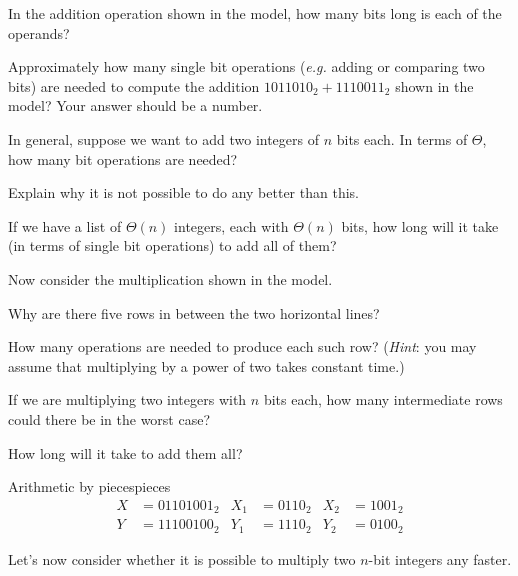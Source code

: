 \documentclass{tufte-handout}
\begin{document}
\begin{questions}
\item In the addition operation shown in the model, how many bits long
  is each of the operands?
\item Approximately how many single bit operations (\emph{e.g.} adding
  or comparing two bits) are needed to compute the addition
  $1011010_2 + 1110011_2$ shown in the model?  Your answer should be a number.
\item In general, suppose we want to add two integers of $n$ bits
  each.  In terms of $\Theta$, how many bit operations are needed?
\item Explain why it is not possible to do any better than this.
\item If we have a list of $\Theta(n)$ integers, each with
  $\Theta(n)$ bits, how long will it take (in terms of single bit
  operations) to add all of them?
\end{questions}

Now consider the multiplication shown in the model.

\begin{questions}
\item Why are there five rows in between the two horizontal lines?
\item How many operations are needed to produce each such row?
  (\emph{Hint}: you may assume that multiplying by a power of two
  takes constant time.)
\item If we are multiplying two integers with $n$ bits each, how many
  intermediate rows could there be in the worst case?
\item How long will it take to add them all?
\end{questions}

\pause

\begin{model*}{Arithmetic by pieces}{pieces}
  \begin{align*}
    X &= 01101001_2 & X_1 &= 0110_2 & X_2 &= 1001_2 \\
    Y &= 11100100_2 & Y_1 &= 1110_2 & Y_2 &= 0100_2
  \end{align*}
\end{model*}

Let's now consider whether it is possible to multiply two $n$-bit
integers any faster.
\end{document}
